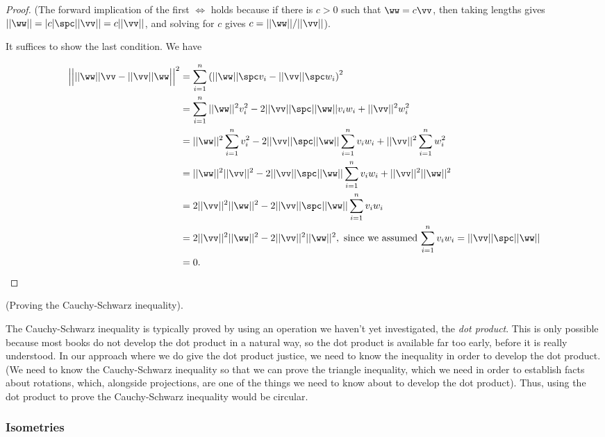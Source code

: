 \begin{proof}
	(The forward implication of the first $\iff$ holds because if there is $c > 0$ such that $\ww = c\vv$, then taking lengths gives $||\ww|| = |c| \spc ||\vv|| = c||\vv||$, and solving for $c$ gives $c = ||\ww||/||\vv||$).
	
	It suffices to show the last condition. We have
	
	\begin{align*}
		\Big|\Big| ||\ww||\vv - ||\vv||\ww \Big|\Big|^2
		&= \sum_{i = 1}^n \left(||\ww|| \spc v_i - ||\vv|| \spc w_i\right)^2 \\
		&= \sum_{i = 1}^n ||\ww||^2 v_i^2 - 2||\vv|| \spc ||\ww|| v_i w_i + ||\vv||^2 w_i^2 \\
		&= ||\ww||^2 \sum_{i = 1}^n v_i^2 - 2 ||\vv|| \spc ||\ww|| \sum_{i = 1}^n v_i w_i + ||\vv||^2 \sum_{i = 1}^n w_i^2 \\
		&= ||\ww||^2 ||\vv||^2 - 2 ||\vv|| \spc ||\ww|| \sum_{i = 1}^n v_i w_i + ||\vv||^2 ||\ww||^2 \\
		&= 2 ||\vv||^2 ||\ww||^2 - 2 ||\vv|| \spc ||\ww|| \sum_{i = 1}^n v_i w_i \\
		&= 2 ||\vv||^2 ||\ww||^2 - 2 ||\vv||^2 ||\ww||^2, \text{ since we assumed $\sum_{i = 1}^n v_i w_i = ||\vv|| \spc ||\ww||$} \\
		&= 0.
	\end{align*}
\end{proof}

\begin{remark}
	(Proving the Cauchy-Schwarz inequality).
	
	The Cauchy-Schwarz inequality is typically proved by using an operation we haven't yet investigated, the \textit{dot product}. This is only possible because most books do not develop the dot product in a natural way, so the dot product is available far too early, before it is really understood. In our approach where we do give the dot product justice, we need to know the inequality in order to develop the dot product. (We need to know the Cauchy-Schwarz inequality so that we can prove the triangle inequality, which we need in order to establish facts about rotations, which, alongside projections, are one of the things we need to know about to develop the dot product). Thus, using the dot product to prove the Cauchy-Schwarz inequality would be circular.
\end{remark}

\subsubsection*{Isometries}

